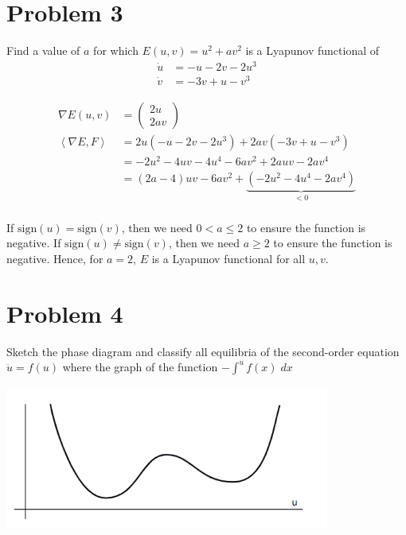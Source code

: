 \documentclass[12pt]{article}
\newcommand{\brak}[1]{\left\langle #1 \right\rangle}
\begin{document}
\color{black}


\pagebreak

\section{Problem 3}
Find a value of $a$ for which $E(u,v) = u^2+ av^2$ is a Lyapunov functional of
\begin{align*}
    \dot u & = -u -2v - 2u^3 \\
    \dot v & = -3v + u - v^3
\end{align*}

\color{blue}

\begin{align*}
    \nabla E(u, v)     & = \begin{pmatrix}
                               2u \\
                               2av
                           \end{pmatrix}                                                \\
    \brak{\nabla E, F} & = 2u(-u - 2v - 2u^3) + 2av(-3v + u - v^3)                       \\
                       & = -2u^2 - 4uv - 4u^4 - 6av^2 + 2auv - 2av^4                     \\
                       & = (2a - 4)uv - 6av^2 + \underbrace{(-2u^2 - 4u^4 - 2av^4)}_{<0} \\
\end{align*}

If $\text{sign}(u) = \text{sign}(v)$, then we need $0 < a \leq 2$ to ensure the function is negative. If $\text{sign}(u) \neq \text{sign}(v)$, then we need $a \geq 2$ to ensure the function is negative. Hence, for $\boxed{a = 2}$, $E$ is a Lyapunov functional for all $u, v$.

\color{black}


\pagebreak

\section{Problem 4}
Sketch the phase diagram and classify all equilibria of the second-order equation $\ddot u = f(u)$ where the graph of the function $-\int^u f(x)\; dx$

\begin{center}
    \includegraphics[width=0.8\textwidth]{4.png}

\end{center}
\end{document}
